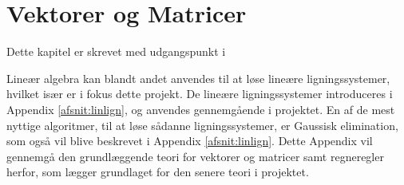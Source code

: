 \chapter{Vektorer og Matricer}
Dette kapitel er skrevet med udgangspunkt i \citep{lial}

Lineær algebra kan blandt andet anvendes til at løse lineære ligningssystemer, hvilket især er i fokus dette projekt. De lineære ligningssystemer introduceres i Appendix \ref{afsnit:linlign}, og anvendes gennemgående i projektet.
En af de mest nyttige algoritmer, til at løse sådanne ligningssystemer, er Gaussisk elimination, som også vil blive beskrevet i Appendix \ref{afsnit:linlign}. Dette Appendix vil gennemgå den grundlæggende teori for vektorer og matricer samt regneregler herfor, som lægger grundlaget for den senere teori i projektet.


%


